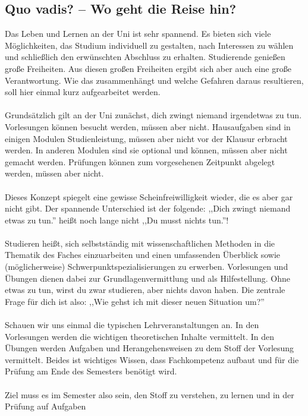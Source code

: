 \subsection{Quo vadis? -- Wo geht die Reise hin?}
        Das Leben und Lernen an der Uni ist sehr spannend. Es bieten
	sich viele Möglichkeiten, das Studium individuell zu gestalten,
	nach Interessen zu wählen und schließlich den erwünschten
	Abschluss zu erhalten. Studierende genießen große Freiheiten. Aus diesen großen Freiheiten ergibt sich aber auch
	eine große Verantwortung. Wie das zusammenhängt und welche
	Gefahren daraus resultieren, soll hier einmal kurz aufgearbeitet
	werden. \\ \\
        Grundsätzlich gilt an der Uni zunächst, dich zwingt niemand irgendetwas zu tun. Vorlesungen können besucht werden, müssen aber nicht.
Hausaufgaben sind in einigen Modulen Studienleistung, müssen aber nicht vor der Klausur erbracht werden. In anderen Modulen sind sie optional und können, müssen aber nicht gemacht werden. 
Prüfungen können zum vorgesehenen Zeitpunkt abgelegt werden, müssen aber
nicht. \\\\
        Dieses Konzept spiegelt eine gewisse Scheinfreiwilligkeit
	wieder, die es aber gar nicht gibt. Der spannende Unterschied ist
	der folgende: ,,Dich zwingt niemand etwas zu tun.'' heißt noch
	lange nicht ,,Du musst nichts tun.''! \\\\
Studieren heißt, sich selbstständig mit wissenschaftlichen Methoden in
die Thematik des Faches einzuarbeiten und einen umfassenden Überblick
sowie (möglicherweise) Schwerpunktspezialisierungen zu erwerben.
Vorlesungen und Übungen dienen dabei zur Grundlagenvermittlung und als
Hilfestellung. Ohne etwas zu tun, wirst du zwar studieren, aber nichts
davon haben. Die zentrale Frage für dich ist also: ,,Wie gehst ich  mit
dieser neuen Situation um?''\\\\
 Schauen wir uns einmal die typischen Lehrveranstaltungen an. 
 In den Vorlesungen werden die wichtigen theoretischen Inhalte vermittelt. 
 In den Übungen werden Aufgaben und Herangehensweisen zu dem Stoff der Vorlesung vermittelt. 
 Beides ist wichtiges Wissen, dass Fachkompetenz aufbaut und für die
 Prüfung am Ende des Semesters benötigt wird.\\\\
Ziel muss es im Semester also sein, den Stoff zu verstehen, zu lernen und in der Prüfung auf Aufgaben 
